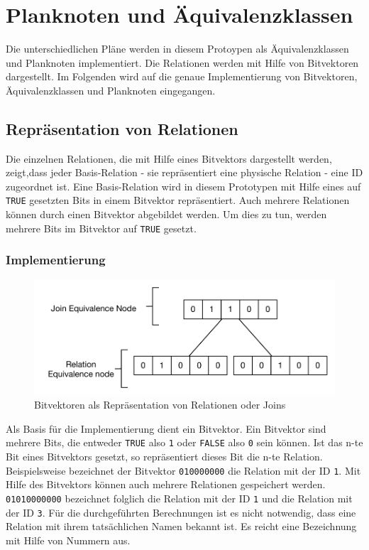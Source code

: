 \section{Planknoten und Äquivalenzklassen}

Die unterschiedlichen Pläne werden in diesem Protoypen als Äquivalenzklassen und Planknoten implementiert. Die Relationen werden mit Hilfe von Bitvektoren dargestellt. Im Folgenden wird auf die genaue Implementierung von Bitvektoren, Äquivalenzklassen und Planknoten eingegangen.

\subsection{Repräsentation von Relationen}
\label{sec:Bitvector}

Die einzelnen Relationen, die mit Hilfe eines Bitvektors dargestellt werden, zeigt,dass jeder Basis-Relation - sie repräsentiert eine physische Relation - eine ID zugeordnet ist. Eine Basis-Relation wird in diesem Prototypen mit Hilfe eines auf \texttt{TRUE} gesetzten Bits in einem Bitvektor repräsentiert. Auch mehrere Relationen können durch einen Bitvektor abgebildet werden. Um dies zu tun, werden mehrere Bits  im Bitvektor auf \texttt{TRUE} gesetzt.

\subsubsection{Implementierung}
\begin{figure}[ht]
  \centering
  \includegraphics[scale=0.75]{04_Implementierung/00_media/Bitvector.pdf}
  \caption{Bitvektoren als Repräsentation von Relationen oder Joins}
  \label{Bitvektor}
\end{figure}

Als Basis für die Implementierung dient ein Bitvektor. Ein Bitvektor sind mehrere Bits, die entweder \texttt{TRUE} also \texttt{1} oder \texttt{FALSE} also \texttt{0} sein können. Ist das n-te Bit eines Bitvektors gesetzt, so repräsentiert dieses Bit die n-te Relation. Beispielsweise bezeichnet der Bitvektor \texttt{010000000} die Relation mit der ID \texttt{1}. Mit Hilfe des Bitvektors können auch mehrere Relationen gespeichert werden. \texttt{01010000000} bezeichnet folglich die Relation mit der ID \texttt{1} und die Relation mit der ID \texttt{3}. Für die durchgeführten Berechnungen ist es nicht notwendig, dass eine Relation mit ihrem tatsächlichen Namen bekannt ist. Es reicht eine Bezeichnung mit Hilfe von Nummern aus.

